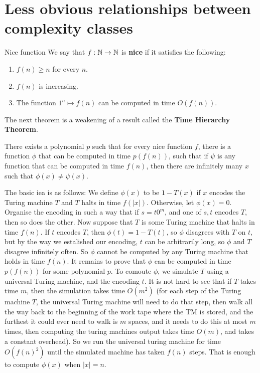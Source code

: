 \documentclass{article}
\begin{document}
\section{Less obvious relationships between complexity classes}
\begin{fancydefine}{Nice function}
    We say that $f : \mathbb{N} \to \mathbb{N}$ is \textbf{nice} if it satisfies the following: \begin{enumerate}
        \item $f(n) \geq n$ for every $n$.
        \item $f(n)$ is increasing.
        \item The function $1^{n} \mapsto f(n)$ can be computed in time $O(f(n))$.
    \end{enumerate}
\end{fancydefine}
The next theorem is a weakening of a result called the \textbf{Time Hierarchy Theorem}.
\begin{fancythm}{}
    There exists a polynomial $p$ such that for every nice function $f$, there is a function $\phi$ that can be computed in time $p(f(n))$, such that if $\psi$ is any function that can be computed in time $f(n)$, then there are infinitely many $x$ such that $\phi(x) \neq \psi(x)$.
\end{fancythm}
\proof The basic iea is as follows: We define $\phi(x)$ to be $1-T(x)$ if $x$ encodes the Turing machine $T$ and $T$ halts in time $f(|x|)$. Otherwise, let $\phi(x)=0$.\gap 
Organise the encoding in such a way that if $s = t0^{m}$, and one of $s,t$ encodes $T$, then so does the other. Now suppose that $T$ is some Turing machine that halts in time $f(n)$. If $t$ encodes $T$, then $\phi(t)=1-T(t)$, so $\phi$ disagrees with $T$ on $t$, but by the way we estalished our encoding, $t$ can be arbitrarily long, so $\phi$ and $T$ disagree infinitely often. So $\phi$ cannot be computed by any Turing machine that holds in time $f(n)$. \gap 
It remains to prove that $\phi$ can be computed in time $p(f(n))$ for some polynomial $p$. To comoute $\phi$, we simulate $T$ using a universal Turing machine, and the encoding $t$. It is not hard to see that if $T$ takes time $m$, then the simulation takes time $O(m^{2})$ (for each step of the Turing machine $T$, the universal Turing machine will need to do that step, then walk all the way back to the beginning of the work tape where the TM is stored, and the furthest it could ever need to walk is $m$ spaces, and it needs to do this at most $m$ times, then computing the turing machines output takes time $O(m)$, and  takes a constant overhead). So we run the universal turing machine for time $O(f(n)^{2})$ until the simulated machine has taken $f(n)$ steps. That is enough to compute $\phi(x)$ when $|x|=n$. \endproof 
\end{document}
